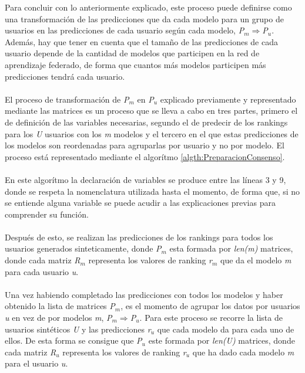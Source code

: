 Para concluir con lo anteriormente explicado, este proceso puede definirse como una transformación de las predicciones que da cada modelo para un grupo de usuarios en las predicciones de cada usuario según cada modelo, \textit{P$_{m}$}$\Longrightarrow $\textit{P$_{u}$}. Además, hay que tener en cuenta que el tamaño de las predicciones de cada usuario depende de la cantidad de modelos que participen en la red de aprendizaje federado, de forma que cuantos más modelos participen más predicciones tendrá cada usuario. 
\\ \\
El proceso de transformación de \textit{P$_{m}$} en \textit{P$_{u}$} explicado previamente y representado mediante las matrices es un proceso que se lleva a cabo en tres partes, primero el de definición de las variables necesarias, segundo el de predecir de los rankings para los \textit{U} usuarios con los \textit{m} modelos y el tercero en el que estas predicciones de los modelos son reordenadas para agruparlas por usuario y no por modelo. El proceso está representado mediante el algorítmo \ref{algth:PreparacionConsenso}.
\\ \\
En este algorítmo la declaración de variables se produce entre las líneas 3 y 9, donde se respeta la nomenclatura utilizada hasta el momento, de forma que, si no se entiende alguna variable se puede acudir a las explicaciones previas para comprender su función. 
\\ \\
Después de esto, se realizan las predicciones de los rankings para todos los usuarios generados sinteticamente, donde \textit{P$_{m}$} esta formada por \textit{len(m)} matrices, donde cada matriz \textit{R$_{m}$} representa los valores de ranking \textit{r$_{m}$} que da el modelo \textit{m} para cada usuario \textit{u}.
\\ \\
Una vez habiendo completado las predicciones con todos los modelos y haber obtenido la lista de matrices \textit{P$_{m}$}, es el momento de agrupar los datos por usuarios \textit{u} en vez de por modelos \textit{m}, \textit{P$_{m}$}$\Longrightarrow $\textit{P$_{u}$}. Para este proceso se recorre la lista de usuarios sintéticos \textit{U} y las predicciones \textit{r$_{u}$} que cada modelo da para cada uno de ellos. De esta forma se consigue que \textit{P$_{u}$} este formada por \textit{len(U)} matrices, donde cada matriz \textit{R$_{u}$} representa los valores de ranking \textit{r$_{u}$} que ha dado cada modelo \textit{m} para el usuario \textit{u}. 

